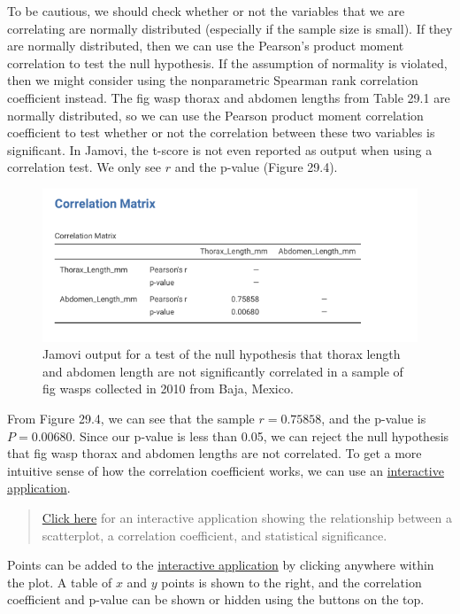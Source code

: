 \documentclass[
]{scrbook}
\begin{document}
To be cautious, we should check whether or not the variables that we are correlating are normally distributed (especially if the sample size is small).
If they are normally distributed, then we can use the Pearson's product moment correlation to test the null hypothesis.
If the assumption of normality is violated, then we might consider using the nonparametric Spearman rank correlation coefficient instead.
The fig wasp thorax and abdomen lengths from Table 29.1 are normally distributed, so we can use the Pearson product moment correlation coefficient to test whether or not the correlation between these two variables is significant.
In Jamovi, the t-score is not even reported as output when using a correlation test.
We only see \(r\) and the p-value (Figure 29.4).

\begin{figure}
\includegraphics[width=1\linewidth]{img/Jamovi_correlation_output} \caption{Jamovi output for a test of the null hypothesis that thorax length and abdomen length are not significantly correlated in a sample of fig wasps collected in 2010 from Baja, Mexico.}\label{fig:unnamed-chunk-149}
\end{figure}

From Figure 29.4, we can see that the sample \(r = 0.75858\), and the p-value is \(P = 0.00680\).
Since our p-value is less than 0.05, we can reject the null hypothesis that fig wasp thorax and abdomen lengths are not correlated.
To get a more intuitive sense of how the correlation coefficient works, we can use an \href{https://bradduthie.shinyapps.io/corr_click/}{interactive application}.

\begin{quote}
\href{https://bradduthie.shinyapps.io/corr_click/}{Click here} for an interactive application showing the relationship between a scatterplot, a correlation coefficient, and statistical significance.
\end{quote}

Points can be added to the \href{https://bradduthie.shinyapps.io/corr_click/}{interactive application} by clicking anywhere within the plot.
A table of \(x\) and \(y\) points is shown to the right, and the correlation coefficient and p-value can be shown or hidden using the buttons on the top.
\end{document}

